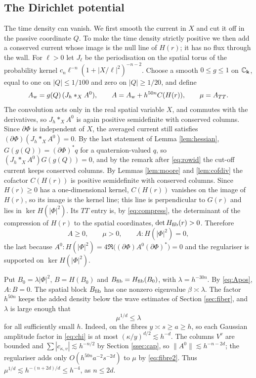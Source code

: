 \subsection{The Dirichlet potential}\label{ssec:potential}
The time density can vanish. We first smooth the current in $X$ and cut it off in the passive
coordinate $Q$. To make the time density strictly positive we then add a conserved current
whose image is the null line of $H(r)$; it has no flux through the wall. For $\ell>0$ let
$J_\ell$ be the periodisation on the spatial torus of the probability kernel
$c_n\ell^{-n}(1+|X/\ell|^2)^{-n-2}$. Choose a smooth $0\le g\le1$ on $\mathbb{C}_{\mathbf k}$, equal to one on
$|Q|\le1/100$ and zero on $|Q|\ge1/20$, and define
\begin{equation}\label{eq:regular}
A_{\rm w}=g(Q)\,(J_h*_XA^0),\qquad A=A_{\rm w}+h^{50n}C(H(r)),\qquad\mu=A_{TT}.
\end{equation}
The convolution acts only in the real spatial variable $X$, and commutes with the derivatives,
so $J_h*_XA^0$ is again positive semidefinite with conserved columns. Since $\partial\Phi$ is
independent of $X$, the averaged current still satisfies $(\partial\Phi)(J_h*_XA^0)=0$. By the last
statement of Lemma \ref{lem:hessian}, $G(g(Q))=(\partial\Phi)^*q$ for a quaternion-valued $q$, so
$(J_h*_XA^0)G(g(Q))=0$, and by the remark after \eqref{eq:rowid} the cut-off current keeps
conserved columns. By Lemmas \ref{lem:moore} and \ref{lem:cofdiv} the cofactor $C(H(r))$ is
positive semidefinite with conserved columns. Since $H(r)\ge0$ has a one-dimensional kernel,
$C(H(r))$ vanishes on the image of $H(r)$, so its image is the kernel line; this line is
perpendicular to $G(r)$ and lies in $\ker H(|\Phi|^2)$. Its $TT$ entry is, by
\eqref{eq:compress}, the determinant of the compression of $H(r)$ to the spatial
coordinates, $\det H_{\mathrm{fib}}(r)>0$. Therefore
\begin{equation}\label{eq:Apos}
A\ge0,\qquad\mu>0,\qquad A:H(|\Phi|^2)=0,
\end{equation}
the last because $A^0:H(|\Phi|^2)=4\Re\bigl((\partial\Phi)A^0(\partial\Phi)^*\bigr)=0$ and the
regulariser is supported on $\ker H(|\Phi|^2)$.

Put $B_0=\lambda|\Phi|^2$, $B=H(B_0)$ and $B_{\rm fib}=H_{\mathrm{fib}}(B_0)$, with $\lambda=h^{-30n}$. By
\eqref{eq:Apos}, $A:B=0$. The spatial block $B_{\rm fib}$ has one nonzero eigenvalue
$\beta\asymp\lambda$. The factor $h^{50n}$ keeps the added density below the wave estimates of
Section \ref{sec:fiber}, and $\lambda$ is large enough that
\begin{equation}\label{eq:lambda}
\mu^{1/d}\le\lambda
\end{equation}
for all sufficiently small $h$. Indeed, on the fibres $y\asymp s\ge a\ge h$, so each Gaussian
amplitude factor in \eqref{eq:chi} is at most $(\kappa/y)^{d/2}\lesssim h^{-d}$. The columns $V^v$
are bounded and $\sum|c_{\kappa,v}|\lesssim h^{-n/2}$ by Section \ref{ssec:cap}, so
$\|A^0\|\lesssim h^{-n-2d}$; the regulariser adds only $O(h^{50n}a^{-2}s^{-2d})$ to $\mu$ by
\eqref{eq:fibre2}. Thus $\mu^{1/d}\lesssim h^{-(n+2d)/d}\le h^{-4}$, as $n\le2d$.


